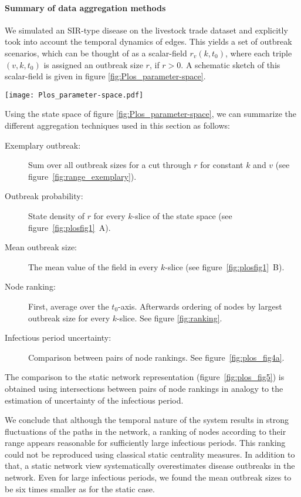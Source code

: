 \paragraph{Summary of data aggregation methods\color{Cayenne}{.}}
We simulated an SIR-type disease on the livestock trade dataset and explicitly took into account the temporal dynamics of edges.
This yields a set of outbreak scenarios, which can be thought of as a scalar-field $r_v(k,t_0)$, where each triple $(v,k,t_0)$ is assigned an outbreak size $r$, if $r>0$.
A schematic sketch of this scalar-field is given in figure \ref{fig:Plos_parameter-space}.
%
\begin{SCfigure}
\texttt{[image: Plos\_parameter-space.pdf]}
\caption{Scalar field representing the set of outbreak scenarios as defined in \eqref{eq:outbreak_set}.
Each combination of starting node $v$, starting time $t_0$ and infectious period $k$ yields an outbreak size $r_v(k,t_0)$.
The domain is bounded as defined in \eqref{eq:outbreak_set}.}
\label{fig:Plos_parameter-space}
\end{SCfigure}
%
Using the state space of figure \ref{fig:Plos_parameter-space}, we can summarize the different aggregation techniques used in this section as follows:
\begin{description}
\item [Exemplary outbreak:] Sum over all outbreak sizes for a cut through $r$ for constant $k$ and $v$ (see figure~\ref{fig:range_exemplary}).
\item [Outbreak probability:] State density of $r$ for every $k$-slice of the state space (see figure~\ref{fig:plosfig1}~A).
\item [Mean outbreak size:] The mean value of the field in every $k$-slice (see figure~\ref{fig:plosfig1}~B).
\item [Node ranking:] First, average over the $t_0$-axis. Afterwards ordering of nodes by largest outbreak size for every $k$-slice. See figure \ref{fig:ranking}.
\item [Infectious period uncertainty:] Comparison between pairs of node rankings. See figure~\ref{fig:plos_fig4a}.
\end{description}
%
The comparison to the static network representation (figure~\ref{fig:plos_fig5}) is obtained using intersections between pairs of node rankings in analogy to the estimation of uncertainty of the infectious period.

We conclude that although the temporal nature of the system results in strong fluctuations of the paths in the network, a ranking of nodes according to their range appears reasonable for sufficiently large infectious periods.
This ranking could not be reproduced using classical static centrality measures.
In addition to that, a static network view systematically overestimates disease outbreaks in the network.
Even for large infectious periods, we found the mean outbreak sizes to be six times smaller as for the static case.





